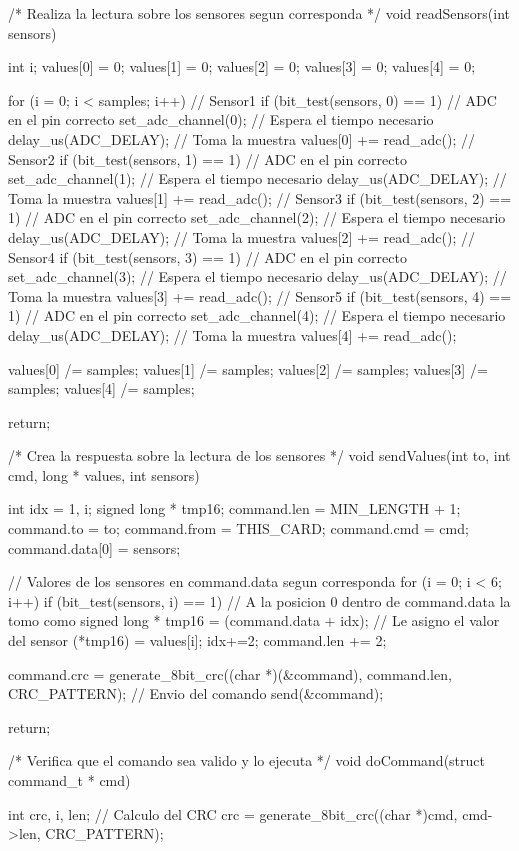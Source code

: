 {\begin{verbatimtab}
/* Realiza la lectura sobre los sensores segun corresponda */
void readSensors(int sensors)
{
	int i;
	values[0] = 0;
	values[1] = 0;
	values[2] = 0;
	values[3] = 0;
	values[4] = 0;
	
	for (i = 0; i < samples; i++)
	{	
		// Sensor1
		if (bit_test(sensors, 0) == 1)
		{
			// ADC en el pin correcto
			set_adc_channel(0);
			// Espera el tiempo necesario
			delay_us(ADC_DELAY);
			// Toma la muestra
			values[0] += read_adc();
		}
		// Sensor2
		if (bit_test(sensors, 1) == 1)
		{
			// ADC en el pin correcto
			set_adc_channel(1);
			// Espera el tiempo necesario
			delay_us(ADC_DELAY);
			// Toma la muestra
			values[1] += read_adc();
		}
		// Sensor3
		if (bit_test(sensors, 2) == 1)
		{
			// ADC en el pin correcto
			set_adc_channel(2);
			// Espera el tiempo necesario
			delay_us(ADC_DELAY);
			// Toma la muestra
			values[2] += read_adc();
		}
		// Sensor4
		if (bit_test(sensors, 3) == 1)
		{
			// ADC en el pin correcto
			set_adc_channel(3);
			// Espera el tiempo necesario
			delay_us(ADC_DELAY);
			// Toma la muestra
			values[3] += read_adc();
		}
		// Sensor5
		if (bit_test(sensors, 4) == 1)
		{
			// ADC en el pin correcto
			set_adc_channel(4);
			// Espera el tiempo necesario
			delay_us(ADC_DELAY);
			// Toma la muestra
			values[4] += read_adc();
		}
	}
	
	values[0] /= samples;
	values[1] /= samples;
	values[2] /= samples;
	values[3] /= samples;
	values[4] /= samples;

	return;
}	

/* Crea la respuesta sobre la lectura de los sensores */
void sendValues(int to, int cmd, long * values, int sensors)
{
	int idx = 1, i;
	signed long * tmp16;
	command.len = MIN_LENGTH + 1;
	command.to = to;
	command.from = THIS_CARD;
	command.cmd = cmd;
	command.data[0] = sensors;

	// Valores de los sensores en command.data segun corresponda
	for (i = 0; i < 6; i++)
	{
		if (bit_test(sensors, i) == 1)
		{
			// A la posicion 0 dentro de command.data la tomo como signed long *
			tmp16 = (command.data + idx);
			// Le asigno el valor del sensor
			(*tmp16) = values[i];
			idx+=2;
			command.len += 2;
		}
	}

	command.crc = generate_8bit_crc((char *)(&command), command.len, CRC_PATTERN);
	// Envio del comando
	send(&command);

	return;
}

/* Verifica que el comando sea valido y lo ejecuta */
void doCommand(struct command_t * cmd)
{
	int crc, i, len;
	// Calculo del CRC
	crc = generate_8bit_crc((char *)cmd, cmd->len, CRC_PATTERN);

}
\end{verbatimtab}}
